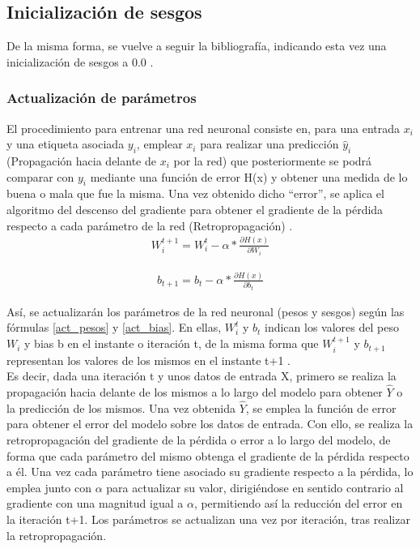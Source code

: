 \subsection{Inicialización de sesgos}

De la misma forma, se vuelve a seguir la bibliografía, indicando esta vez una inicialización de sesgos a 0.0 \cite{ini_bias} \cite{ini_bias_2}.

\subsubsection{Actualización de parámetros}
El procedimiento para entrenar una red neuronal consiste en, para una entrada $x_i$ y una etiqueta asociada $y_i$, emplear $x_i$ para realizar una predicción $\hat{y}_i$ (Propagación hacia delante de $x_i$ por la red) que posteriormente se podrá comparar con $y_i$ mediante una función de error H(x) y obtener una medida de lo buena o mala que fue la misma. Una vez obtenido dicho ``error'', se aplica el algoritmo del descenso del gradiente para obtener el gradiente de la pérdida respecto a cada parámetro de la red (Retropropagación) \cite{Cross_entropy}. \\

\begin{gather}
	W^{t+1}_i = W^{t}_i - \alpha * \frac{\partial H(x)}{\partial W_{i}} 
	\label{act_pesos}
\end{gather}

\begin{gather}
	b_{t+1} = b_{t} - \alpha * \frac{\partial H(x)}{\partial b_{t}}
	\label{act_bias}
\end{gather}


Así, se actualizarán los parámetros de la red neuronal (pesos y sesgos) según las fórmulas \ref{act_pesos} y \ref{act_bias}. En ellas, $W^t_i$ y $b_t$ indican los valores del peso $W_i$ y bias b en el instante o iteración t, de la misma forma que $W^{t+1}_i$ y $b_{t+1}$ representan los valores de los mismos en el instante t+1 \cite{SGD_act_params}. \\
Es decir, dada una iteración t y unos datos de entrada X, primero se realiza la propagación hacia delante de los mismos a lo largo del modelo para obtener  $\hat{Y}$ o la predicción de los mismos. Una vez obtenida $\hat{Y}$, se emplea la función de error para obtener el error del modelo sobre los datos de entrada. Con ello, se realiza la retropropagación del gradiente de la pérdida o error a lo largo del modelo, de forma que cada parámetro del mismo obtenga el gradiente de la pérdida respecto a él. Una vez cada parámetro tiene asociado su gradiente respecto a la pérdida, lo emplea junto con $\alpha$ para actualizar su valor, dirigiéndose en sentido contrario al gradiente con una magnitud igual a $\alpha$, permitiendo así la reducción del error en la iteración t+1. Los parámetros se actualizan una vez por iteración, tras realizar la retropropagación.

